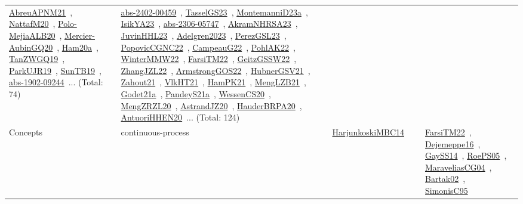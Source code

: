 {\begin{longtable}{lp{3cm}>{\raggedright\arraybackslash}p{6cm}>{\raggedright\arraybackslash}p{6cm}>{\raggedright\arraybackslash}p{8cm}}
\href{../works/AbreuAPNM21.pdf}{AbreuAPNM21}~\cite{AbreuAPNM21}, \href{../works/NattafM20.pdf}{NattafM20}~\cite{NattafM20}, \href{../works/Polo-MejiaALB20.pdf}{Polo-MejiaALB20}~\cite{Polo-MejiaALB20}, \href{../works/Mercier-AubinGQ20.pdf}{Mercier-AubinGQ20}~\cite{Mercier-AubinGQ20}, \href{../works/Ham20a.pdf}{Ham20a}~\cite{Ham20a}, \href{../works/TanZWGQ19.pdf}{TanZWGQ19}~\cite{TanZWGQ19}, \href{../works/ParkUJR19.pdf}{ParkUJR19}~\cite{ParkUJR19}, \href{../works/SunTB19.pdf}{SunTB19}~\cite{SunTB19}, \href{../works/abs-1902-09244.pdf}{abs-1902-09244}~\cite{abs-1902-09244}... (Total: 74) & \href{../works/abs-2402-00459.pdf}{abs-2402-00459}~\cite{abs-2402-00459}, \href{../works/TasselGS23.pdf}{TasselGS23}~\cite{TasselGS23}, \href{../works/MontemanniD23a.pdf}{MontemanniD23a}~\cite{MontemanniD23a}, \href{../works/IsikYA23.pdf}{IsikYA23}~\cite{IsikYA23}, \href{../works/abs-2306-05747.pdf}{abs-2306-05747}~\cite{abs-2306-05747}, \href{../works/AkramNHRSA23.pdf}{AkramNHRSA23}~\cite{AkramNHRSA23}, \href{../works/JuvinHHL23.pdf}{JuvinHHL23}~\cite{JuvinHHL23}, \href{../works/Adelgren2023.pdf}{Adelgren2023}~\cite{Adelgren2023}, \href{../works/PerezGSL23.pdf}{PerezGSL23}~\cite{PerezGSL23}, \href{../works/PopovicCGNC22.pdf}{PopovicCGNC22}~\cite{PopovicCGNC22}, \href{../works/CampeauG22.pdf}{CampeauG22}~\cite{CampeauG22}, \href{../works/PohlAK22.pdf}{PohlAK22}~\cite{PohlAK22}, \href{../works/WinterMMW22.pdf}{WinterMMW22}~\cite{WinterMMW22}, \href{../works/FarsiTM22.pdf}{FarsiTM22}~\cite{FarsiTM22}, \href{../works/GeitzGSSW22.pdf}{GeitzGSSW22}~\cite{GeitzGSSW22}, \href{../works/ZhangJZL22.pdf}{ZhangJZL22}~\cite{ZhangJZL22}, \href{../works/ArmstrongGOS22.pdf}{ArmstrongGOS22}~\cite{ArmstrongGOS22}, \href{../works/HubnerGSV21.pdf}{HubnerGSV21}~\cite{HubnerGSV21}, \href{../works/Zahout21.pdf}{Zahout21}~\cite{Zahout21}, \href{../works/VlkHT21.pdf}{VlkHT21}~\cite{VlkHT21}, \href{../works/HamPK21.pdf}{HamPK21}~\cite{HamPK21}, \href{../works/MengLZB21.pdf}{MengLZB21}~\cite{MengLZB21}, \href{../works/Godet21a.pdf}{Godet21a}~\cite{Godet21a}, \href{../works/PandeyS21a.pdf}{PandeyS21a}~\cite{PandeyS21a}, \href{../works/WessenCS20.pdf}{WessenCS20}~\cite{WessenCS20}, \href{../works/MengZRZL20.pdf}{MengZRZL20}~\cite{MengZRZL20}, \href{../works/AstrandJZ20.pdf}{AstrandJZ20}~\cite{AstrandJZ20}, \href{../works/HauderBRPA20.pdf}{HauderBRPA20}~\cite{HauderBRPA20}, \href{../works/AntuoriHHEN20.pdf}{AntuoriHHEN20}~\cite{AntuoriHHEN20}... (Total: 124)\\
Concepts & continuous-process & \href{../works/HarjunkoskiMBC14.pdf}{HarjunkoskiMBC14}~\cite{HarjunkoskiMBC14} &  & \href{../works/FarsiTM22.pdf}{FarsiTM22}~\cite{FarsiTM22}, \href{../works/Dejemeppe16.pdf}{Dejemeppe16}~\cite{Dejemeppe16}, \href{../works/GaySS14.pdf}{GaySS14}~\cite{GaySS14}, \href{../works/RoePS05.pdf}{RoePS05}~\cite{RoePS05}, \href{../works/MaraveliasCG04.pdf}{MaraveliasCG04}~\cite{MaraveliasCG04}, \href{../works/Bartak02.pdf}{Bartak02}~\cite{Bartak02}, \href{../works/SimonisC95.pdf}{SimonisC95}~\cite{SimonisC95}\\

\end{longtable}}

